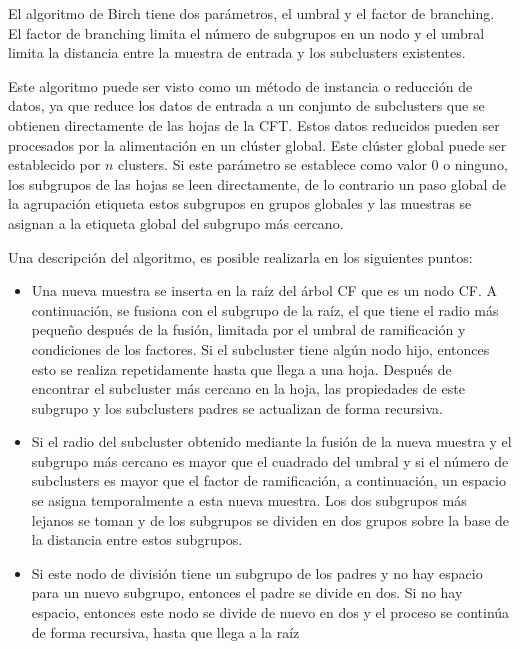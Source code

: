 El algoritmo de Birch tiene dos parámetros, el umbral y el factor de branching. El factor de branching limita el número de subgrupos en un nodo y el umbral limita la distancia entre la muestra de entrada y los subclusters existentes.

Este algoritmo puede ser visto como un método de instancia o reducción de datos, ya que reduce los datos de entrada a un conjunto de subclusters que se obtienen directamente de las hojas de la CFT. Estos datos reducidos pueden ser procesados por la alimentación en un clúster global. Este clúster global puede ser establecido por $n$ clusters. Si este parámetro se establece como valor 0 o ninguno, los subgrupos de las hojas se leen directamente, de lo contrario un paso global de la agrupación etiqueta estos subgrupos en grupos globales y las muestras se asignan a la etiqueta global del subgrupo más cercano.

Una descripción del algoritmo, es posible realizarla en los siguientes puntos:

\begin{itemize}
	
	\item Una nueva muestra se inserta en la raíz del árbol CF que es un nodo CF. A continuación, se fusiona con el subgrupo de la raíz, el que tiene el radio más pequeño después de la fusión, limitada por el umbral de ramificación y condiciones de los factores. Si el subcluster tiene algún nodo hijo, entonces esto se realiza repetidamente hasta que llega a una hoja. Después de encontrar el subcluster más cercano en la hoja, las propiedades de este subgrupo y los subclusters padres se actualizan de forma recursiva.
	
	\item Si el radio del subcluster obtenido mediante la fusión de la nueva muestra y el subgrupo más cercano es mayor que el cuadrado del umbral y si el número de subclusters es mayor que el factor de ramificación, a continuación, un espacio se asigna temporalmente a esta nueva muestra. Los dos subgrupos más lejanos se toman y de los subgrupos se dividen en dos grupos sobre la base de la distancia entre estos subgrupos.
	
	\item Si este nodo de división tiene un subgrupo de los padres y no hay espacio para un nuevo subgrupo, entonces el padre se divide en dos. Si no hay espacio, entonces este nodo se divide de nuevo en dos y el proceso se continúa de forma recursiva, hasta que llega a la raíz
	
\end{itemize}

